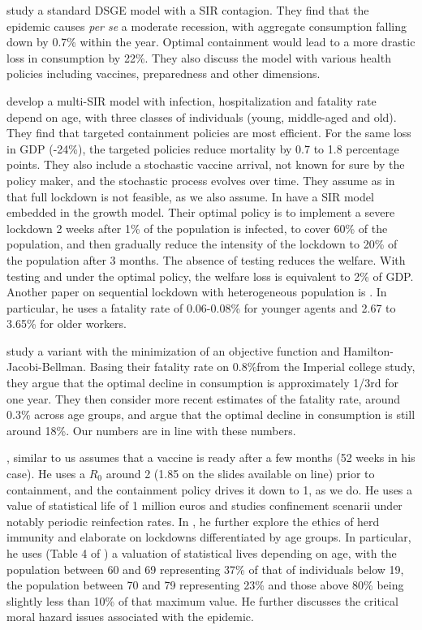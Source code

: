 \documentclass{amsart}
\begin{document}
\cite{eichenbaum2020macroeconomics} study a standard DSGE model with a SIR contagion. They find that the epidemic causes \textit{per se} a moderate recession, with aggregate consumption falling down by 0.7\% within the year. Optimal containment would lead to a more drastic loss in consumption by 22\%. They also discuss the model with various health policies including vaccines, preparedness and other dimensions.

\cite{acemoglu2020multi} develop a multi-SIR model with infection, hospitalization and fatality rate depend on age, with three classes of individuals (young, middle-aged and old). They find that targeted containment policies are most efficient. For the same loss in GDP (-24\%), the targeted policies reduce mortality by 0.7 to 1.8 percentage points. They also include a stochastic vaccine arrival, not known for sure by the policy maker, and the stochastic process evolves over time. They assume as in \cite{alvarez2020simple} that full lockdown is not feasible, as we also assume. In \cite{alvarez2020simple} have a SIR model embedded in the growth model. Their optimal policy is to implement a severe lockdown 2 weeks after 1\% of the population is infected, to cover 60\% of the population, and then gradually reduce the intensity of the lockdown to 20\% of the population after 3 months. The absence of testing reduces the welfare. With testing and under the optimal policy, the welfare loss is equivalent to 2\% of GDP. Another paper on sequential lockdown with heterogeneous population is \cite{rampini2020sequential}. In particular, he uses a fatality rate of 0.06-0.08\% for younger agents and 2.67 to 3.65\% for older workers.


\cite{hall2020trading} study a variant with the minimization of an objective function and Hamilton-Jacobi-Bellman. Basing their fatality rate on 0.8\%from the Imperial college study, they argue that the optimal decline in consumption is approximately 1/3rd for one year. They then consider more recent estimates of the fatality rate, around 0.3\% across age groups, and argue that the optimal decline in consumption is still around 18\%. Our numbers are in line with these numbers.      

\cite{gollier_slides}, similar to us
assumes that a vaccine is ready after a few months (52 weeks in his case). He uses a $R_0$ around 2 (1.85 on the slides available on line) prior to containment, and the containment policy drives it down to 1, as we do. He uses a value of statistical life of 1 million euros and studies confinement scenarii under notably periodic reinfection rates. In \cite{gollier_paper_2, gollier2020cost}, he further explore the ethics of herd immunity and elaborate on lockdowns differentiated by age groups. In particular, he uses (Table 4 of \cite{gollier_paper_2}) a valuation of statistical lives depending on age, with the population between 60 and 69 representing 37\% of that of individuals below 19, the population between 70 and 79 representing 23\% and those above 80\% being slightly less than 10\% of that maximum value. He further discusses the critical moral hazard issues associated with the epidemic.
\end{document}
